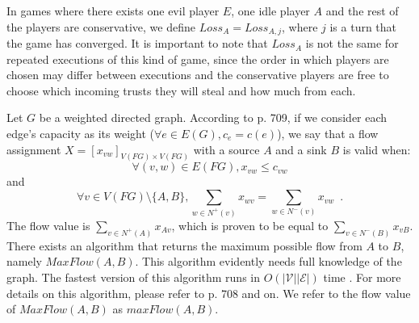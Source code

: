 \documentclass[11pt]{llncs}
\theoremstyle{definition}
\begin{document}
    In games where there exists one evil player $E$, one idle player $A$ and the rest of the players are conservative, we
    define $Loss_A = Loss_{A, j}$, where $j$ is a turn that the game has converged. It is important to note that $Loss_A$ is
    not the same for repeated executions of this kind of game, since the order in which players are chosen may differ between
    executions and the conservative players are free to choose which incoming trusts they will steal and how much from each.

    Let $G$ be a weighted directed graph. According to \cite{clrs} p. 709, if we consider each edge's capacity as its weight
    ($\forall e \in E(G), c_e = c(e)$), we say that a flow assignment $X = [x_{vw}]_{V(FG) \times V(FG)}$ with a source $A$
    and a sink $B$ is valid when:
    \begin{equation}
    \label{flow1}
       \forall (v, w) \in E(FG), x_{vw} \leq c_{vw}
    \end{equation}
    and
    \begin{equation}
    \label{flow2}
       \forall v \in V(FG) \setminus \{A,B\}, \sum\limits_{w \in N^{+}(v)}x_{wv} = \sum\limits_{w \in N^{-}(v)}x_{vw}
       \enspace.
    \end{equation}
    The flow value is $\sum\limits_{v \in N^{+}\left(A\right)}x_{Av}$, which is proven to be equal to
    $\sum\limits_{v \in N^{-}\left(B\right)}x_{vB}$. There exists an algorithm that returns the maximum possible flow from
    $A$ to $B$, namely $MaxFlow\left(A, B\right)$. This algorithm evidently needs full knowledge of the graph. The fastest
    version of this algorithm runs in $O\left(|\mathcal{V}||\mathcal{E}|\right)$ time \cite{maxflownm}. For more details on
    this algorithm, please refer to \cite{clrs} p. 708 and on. We refer to the flow value of $MaxFlow\left(A, B\right)$ as
    $maxFlow\left(A, B\right)$.
\end{document}
